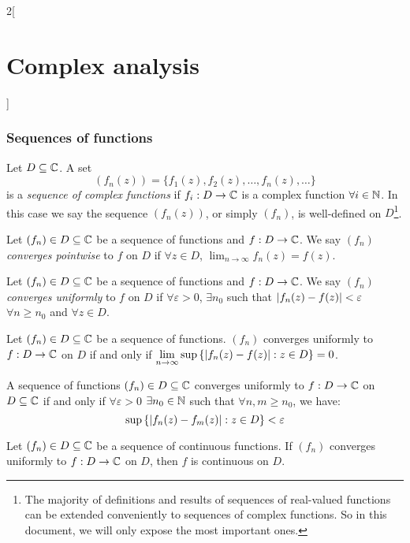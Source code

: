 \documentclass[../../../main_math.tex]{subfiles}
\begin{document}
\begin{multicols}{2}[\section{Complex analysis}]
  \subsubsection{Sequences of functions}
  \begin{definition}
    Let $D\subseteq\mathbb{C}$. A set $$(f_n(z))=\{f_1(z),f_2(z),\ldots,f_n(z),\ldots\}$$ is a \emph{sequence of complex functions} if $f_i:D\rightarrow\mathbb{C} $ is a complex function $\forall i\in\mathbb{N}$. In this case we say the sequence $(f_n(z))$, or simply $(f_n)$, is well-defined on $D$\footnote{The majority of definitions and results of sequences of real-valued functions can be extended conveniently to sequences of complex functions. So in this document, we will only expose the most important ones.}.
  \end{definition}
  \begin{definition}
    Let $(f_n)\in D\subseteq\mathbb{C}$ be a sequence of functions and $f:D\rightarrow\mathbb{C}$. We say $(f_n)$ \emph{converges pointwise} to $f$ on $D$ if $\forall z\in D$, $\displaystyle\lim_{n\to\infty}f_n(z)=f(z)$.
  \end{definition}
  \begin{definition}
    Let $(f_n)\in D\subseteq\mathbb{C}$ be a sequence of functions and $f:D\rightarrow\mathbb{C}$. We say $(f_n)$ \emph{converges uniformly} to $f$ on $D$ if $\forall\varepsilon>0$, $\exists n_0$ such that $\abs{f_n(z)-f(z)}<\varepsilon$ $\forall n\geq n_0$ and $\forall z\in D$.
  \end{definition}
  \begin{lemma}
    Let $(f_n)\in D\subseteq\mathbb{C}$ be a sequence of functions. $(f_n)$ converges uniformly to $f:D\rightarrow\mathbb{C}$ on $D$ if and only if $\displaystyle \lim_{n\to\infty}\sup\left\{\abs{f_n(z)-f(z)}:z\in D\right\}=0$.
  \end{lemma}
  \begin{theorem}
    A sequence of functions $(f_n)\in D\subseteq\mathbb{C}$ converges uniformly to $f:D\rightarrow\mathbb{C}$ on $D\subseteq\mathbb{C}$ if and only if $\forall\varepsilon>0$ $\exists n_0\in\mathbb{N}$ such that  $\forall n,m\geq n_0$, we have: $$\sup\left\{\abs{f_n(z)-f_m(z)}:z\in D\right\}< \varepsilon$$
  \end{theorem}
  \begin{theorem}
    Let $(f_n)\in D\subseteq\mathbb{C}$ be a sequence of continuous functions. If $(f_n)$ converges uniformly to $f:D\rightarrow\mathbb{C}$ on $D$, then $f$ is continuous on $D$.
  \end{theorem}

\end{multicols}
\end{document}
